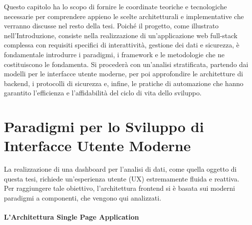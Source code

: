 \documentclass[12pt,a4paper,openright,twoside]{book}
\begin{document}
Questo capitolo ha lo scopo di fornire le coordinate teoriche e tecnologiche necessarie per comprendere appieno le scelte architetturali e implementative che verranno discusse nel resto della tesi. Poiché il progetto, come illustrato nell'Introduzione, consiste nella realizzazione di un'applicazione web full-stack complessa con requisiti specifici di interattività, gestione dei dati e sicurezza, è fondamentale introdurre i paradigmi, i framework e le metodologie che ne costituiscono le fondamenta. Si procederà con un'analisi stratificata, partendo dai modelli per le interfacce utente moderne, per poi approfondire le architetture di backend, i protocolli di sicurezza e, infine, le pratiche di automazione che hanno garantito l'efficienza e l'affidabilità del ciclo di vita dello sviluppo.

\section{Paradigmi per lo Sviluppo di Interfacce Utente Moderne}

La realizzazione di una dashboard per l'analisi di dati, come quella oggetto di questa tesi, richiede un'esperienza utente (UX) estremamente fluida e reattiva. Per raggiungere tale obiettivo, l'architettura frontend si è basata sui moderni paradigmi a componenti, che vengono qui analizzati.

\paragraph{L'Architettura Single Page Application}
\end{document}
